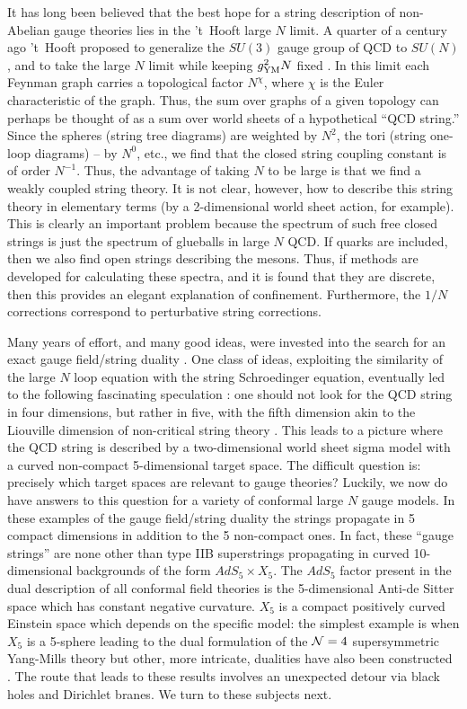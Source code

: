 \documentclass[12pt]{article}
\begin{document}
It has long been believed that the best hope for a string description
of non-Abelian gauge theories lies in the 't~Hooft large $N$ limit.
A quarter of a century ago 't~Hooft proposed to generalize the $SU(3)$
gauge group of QCD to $SU(N)$, and to take the large $N$ limit while keeping
$g_{{\rm YM}}^2 N$ fixed \cite{GT}. In this limit each Feynman graph carries
a topological factor $N^\chi$, where $\chi$ is the Euler
characteristic of the graph.
Thus, the sum over graphs of a given topology can perhaps be thought of
as a sum over world sheets of a hypothetical ``QCD string.'' 
Since the spheres (string tree diagrams)
are weighted by $N^2$, the tori (string one-loop diagrams) -- 
by $N^0$, etc., we find that the closed string coupling constant is of order
$N^{-1}$. Thus, the advantage of taking $N$ to be large is that we find
a weakly coupled string theory. It is not clear, however, how to describe
this string theory in elementary terms (by a 2-dimensional world sheet action, 
for example). This is clearly an important problem because the 
spectrum  of such free closed strings is just the  
spectrum of glueballs in large $N$ QCD.
If quarks are included, then we also find open strings describing the 
mesons. Thus, if methods are developed for calculating these spectra,
and it is found that they are discrete, then
this provides an elegant
explanation of confinement. Furthermore, the $1/N$ corrections 
correspond to perturbative string corrections.

Many years of effort, and many good ideas, were invested into the search
for an exact gauge field/string duality \cite{book}. 
One class of ideas, exploiting
the similarity of the large $N$ loop equation with the string Schroedinger
equation, eventually led to the following fascinating 
speculation \cite{Sasha}:
one should not look for the QCD string in four dimensions, but rather
in five, with the fifth dimension akin to the Liouville dimension of
non-critical string theory \cite{bos}. This leads to a picture
where the QCD string is described by a two-dimensional world sheet
sigma model with a curved non-compact 5-dimensional target space. 
The difficult question is:
precisely which target spaces are relevant to gauge theories?
Luckily, we now do have answers to this question for a variety of
conformal large $N$ gauge models. In these
examples of the gauge field/string duality the strings
propagate in 5 compact dimensions in addition to the 5 non-compact
ones. In fact, these ``gauge strings'' are none other than type IIB
superstrings propagating in curved 10-dimensional backgrounds of the
form $AdS_5\times X_5$. The $AdS_5$ factor
present in the dual description of all conformal
field theories is the 5-dimensional Anti-de Sitter
space which has constant negative curvature. $X_5$ is a compact 
positively curved Einstein space which depends on the specific model: the
simplest example is when $X_5$ is a 5-sphere leading to the dual
formulation of the ${\cal N}=4$ supersymmetric Yang-Mills theory
\cite{jthroat,US,EW} but
other, more intricate, dualities have also been constructed
\cite{ks,lnv,KW}.
The route that leads to these results 
involves an unexpected detour via black holes and Dirichlet branes.
We turn to these subjects next.
\end{document}

